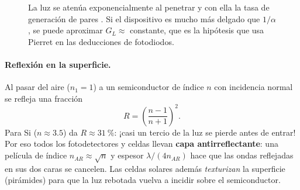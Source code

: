 \begin{figure}[H]
\centering
{}
\caption{La luz se atenúa exponencialmente al penetrar y con ella la tasa de generación de
pares . Si el dispositivo es mucho más delgado que $1/\alpha$, se puede aproximar
$G_L\approx$ constante, que es la hipótesis que usa Pierret en las deducciones de
fotodiodos.}
\label{fig:fotogeneracion}
\end{figure}

\paragraph{Reflexión en la superficie.} Al pasar del aire ($n_1=1$) a un semiconductor de
índice $n$ con incidencia normal se refleja una fracción
\[
  R = \left(\frac{n-1}{n+1}\right)^2 .
\]
Para Si ($n\approx3.5$) da $R\approx\SI{31}{\percent}$: ¡casi un tercio de la luz se pierde
antes de entrar! Por eso todos los fotodetectores y celdas llevan \textbf{capa
antirreflectante}: una película de índice $n_{AR}\approx\sqrt{n}$ y espesor
$\lambda/(4n_{AR})$ hace que las ondas reflejadas en sus dos caras se cancelen. Las celdas
solares además \emph{texturizan} la superficie (pirámides) para que la luz rebotada
vuelva a incidir sobre el semiconductor.


